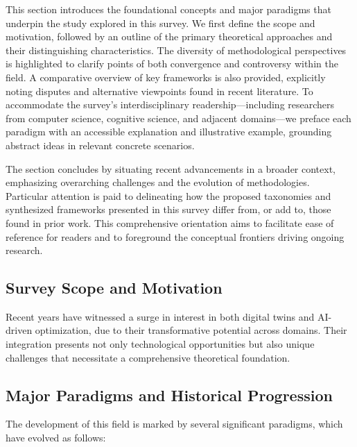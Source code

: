 \documentclass[sigconf]{acmart}
\begin{document}
This section introduces the foundational concepts and major paradigms that underpin the study explored in this survey. We first define the scope and motivation, followed by an outline of the primary theoretical approaches and their distinguishing characteristics. The diversity of methodological perspectives is highlighted to clarify points of both convergence and controversy within the field. A comparative overview of key frameworks is also provided, explicitly noting disputes and alternative viewpoints found in recent literature. To accommodate the survey's interdisciplinary readership—including researchers from computer science, cognitive science, and adjacent domains—we preface each paradigm with an accessible explanation and illustrative example, grounding abstract ideas in relevant concrete scenarios.

The section concludes by situating recent advancements in a broader context, emphasizing overarching challenges and the evolution of methodologies. Particular attention is paid to delineating how the proposed taxonomies and synthesized frameworks presented in this survey differ from, or add to, those found in prior work. This comprehensive orientation aims to facilitate ease of reference for readers and to foreground the conceptual frontiers driving ongoing research.

\subsection{Survey Scope and Motivation}
Recent years have witnessed a surge in interest in both digital twins and AI-driven optimization, due to their transformative potential across domains. Their integration presents not only technological opportunities but also unique challenges that necessitate a comprehensive theoretical foundation.

\subsection{Major Paradigms and Historical Progression}
The development of this field is marked by several significant paradigms, which have evolved as follows:
\end{document}
